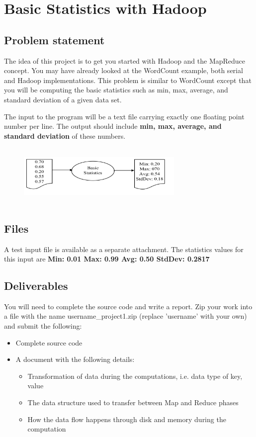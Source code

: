 
\section*{Basic Statistics with Hadoop}       

\subsection*{Problem statement}
 
The idea of this project is to get you started with Hadoop and the MapReduce concept. You may have already looked at the WordCount example, both serial and Hadoop implementations. This problem is similar to WordCount except that you will be computing the basic statistics such as min, max, average, and standard deviation of a given data set.

The input to the program will be a text file carrying exactly one floating point number per line. The output should include \textbf{min, max, average, and standard deviation} of these numbers.

\begin{figure}[!htbp]
\includegraphics[width=8cm,height=3cm]{section/icloud/assignment/problems/project1/p1example.png}
\centering
\end{figure}

\subsection*{Files}
A test input file is available as a separate attachment.
The statistics values for this input are \textbf{Min: 0.01 Max: 0.99 Avg: 0.50 StdDev: 0.2817}


\subsection*{Deliverables}

You will need to complete the source code and write a report. Zip your work into a file with the name username\_project1.zip (replace 'username' with your own) and submit the following:

\begin{itemize}
\item Complete source code
\item A document with the following details:

  \begin{itemize}
  \item	Transformation of data during the computations, i.e. data type of key, value
  \item	The data structure used to transfer between Map and Reduce phases
  \item	How the data flow happens through disk and memory during the computation
  \end{itemize}

\end{itemize}

